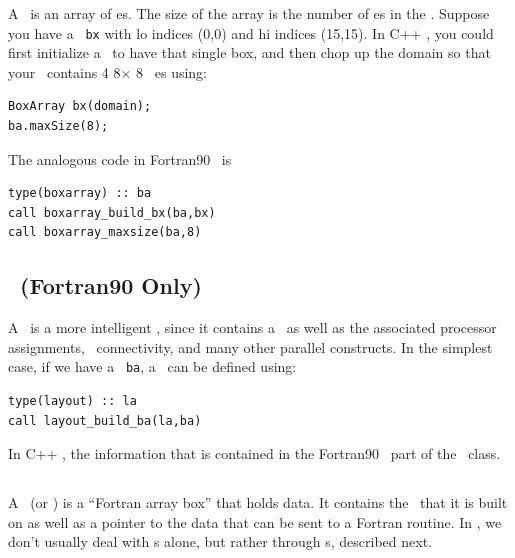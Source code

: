 A \BoxArray\ is an array of \BoxType es.   The size of the array is the 
number of \BoxType es in the \BoxArray.
Suppose you have a \BoxType\ {\tt bx} with lo indices (0,0) and hi indices (15,15).
In C++ \BoxLib, you could first initialize a \BoxArray\ to have that single box, and then
chop up the domain so that your \BoxArray\ contains 4 8$\times$ 8 \BoxType\ es using:
\begin{lstlisting}[language={[gnu]make},mathescape=false]
BoxArray bx(domain);
ba.maxSize(8);
\end{lstlisting}
The analogous code in Fortran90 \BoxLib\ is
\begin{lstlisting}[language={[gnu]make},mathescape=false]
type(boxarray) :: ba
call boxarray_build_bx(ba,bx)
call boxarray_maxsize(ba,8)
\end{lstlisting}

\subsection{\Layout\ (Fortran90 Only)}

A \Layout\ is a more intelligent \BoxArray, since it contains a \BoxArray\ as well
as the associated processor assignments, \BoxType\ connectivity, and many other
parallel constructs.  In the simplest case, if we have a \BoxArray\ {\tt ba}, a 
\Layout\ can be defined using:
\begin{lstlisting}[language={[gnu]make},mathescape=false]
type(layout) :: la
call layout_build_ba(la,ba)
\end{lstlisting}
In C++ \BoxLib, the information that is contained in the Fortran90 \Layout\ part of
the \MultiFab\ class.

\subsection{\FArrayBox}

A \FArrayBox\ (or \Fab) is a ``Fortran array box'' that holds data.  It contains the
\BoxType\ that it is built on as well as a pointer to the data 
that can be sent to a Fortran routine.  In \BoxLib, we don't usually deal with 
\Fab s alone, but rather through \MultiFab s, described next.

\subsection{\MultiFab}

